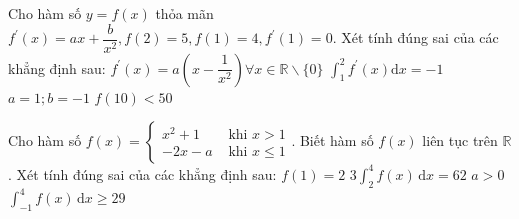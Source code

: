 \begin{ex}
	Cho hàm số $y=f(x)$ thỏa mãn $f^{\prime}(x)=a x+\dfrac{b}{x^2}, f(2)=5, f(1)=4, f^{\prime}(1)=0$. Xét tính đúng sai của các khẳng định sau:
	\choiceTF
	{\True $f^{\prime}(x)=a\left(x-\dfrac{1}{x^2}\right) \forall x \in \mathbb{R} \backslash\{0\}$}
	{$\displaystyle\int_1^2 f^{\prime}(x) \mathrm{d} x=-1$}
	{\True $a=1 ; b=-1$}
	{$f(10)<50$}
\end{ex}
\begin{ex}
	Cho hàm số $f(x)=\left\{\begin{array}{ll}x^2+1 & \text { khi } x>1 \\ -2 x-a & \text { khi } x \leq 1\end{array}\right.$. Biết hàm số $f(x)$ liên tục trên $\mathbb{R}$. Xét tính đúng sai của các khẳng định sau:
	\choiceTF
	{$f(1)=2$}
	{$3 \displaystyle\int_2^4 f(x) \mathrm{\,d} x=62$}
	{$a>0$}
	{$\displaystyle\int_{-1}^4 f(x) \mathrm{\,d} x \geq 29$}
	\loigiai{
		
	}
\end{ex}
